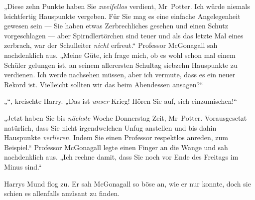 „Diese zehn Punkte haben Sie \emph{zweifellos} verdient, Mr~Potter. Ich würde niemals leichtfertig Hauspunkte vergeben. Für Sie mag es eine einfache Angelegenheit gewesen sein — Sie haben etwas Zerbrechliches gesehen und einen Schutz vorgeschlagen — aber Spirndlertörchen sind teuer und als das letzte Mal eines zerbrach, war der Schulleiter \emph{nicht} erfreut.“ Professor McGonagall sah nachdenklich aus.
„Meine Güte, ich frage mich, ob es wohl schon mal einem Schüler gelungen ist, an seinem allerersten Schultag siebzehn Hauspunkte zu verdienen. Ich werde nachsehen müssen, aber ich vermute, dass es ein neuer Rekord ist. Vielleicht sollten wir das beim Abendessen ansagen?“

„“, kreischte Harry.
„Das ist \emph{unser} Krieg! Hören Sie auf, sich einzumischen!“

„Jetzt haben Sie bis \emph{nächste} Woche Donnerstag Zeit, Mr~Potter. Vorausgesetzt natürlich, dass Sie nicht irgendwelchen Unfug anstellen und bis dahin Hauspunkte \emph{verlieren}. Indem Sie einen Professor respektlos anreden, zum Beispiel.“ Professor McGonagall legte einen Finger an die Wange und sah nachdenklich aus.
„Ich rechne damit, dass Sie noch vor Ende des Freitags im Minus sind.“

Harrys Mund flog zu. Er sah McGonagall so böse an, wie er nur konnte, doch sie schien es allenfalls amüsant zu finden.

